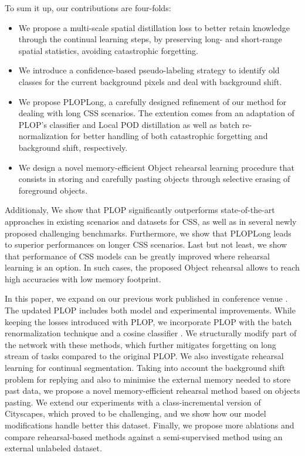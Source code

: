 To sum it up, our contributions are four-folds:
\begin{itemize}
    \item We propose a multi-scale spatial distillation loss to better retain knowledge through the
          continual learning steps, by preserving long- and short-range spatial statistics, avoiding
          catastrophic forgetting.
    \item We introduce a confidence-based pseudo-labeling strategy to identify old classes for the
          current background pixels and deal with background shift.
    \item We propose PLOPLong, a carefully designed refinement of our method for dealing with long
          CSS scenarios. The extention comes from an adaptation of PLOP's classifier and Local POD
          distillation as well as batch re-normalization for better handling of both catastrophic
          forgetting and background shift, respectively.
    \item We design a novel memory-efficient Object rehearsal learning procedure that consists in
          storing and carefully pasting objects through selective erasing of foreground objects.
\end{itemize}

Additionaly, We show that PLOP significantly outperforms state-of-the-art approaches in existing
scenarios and datasets for CSS, as well as in several newly proposed challenging benchmarks.
Furthermore, we show that PLOPLong leads to superior performances on longer CSS scenarios. Last but
not least, we show that performance of CSS models can be greatly improved where rehearsal learning
is an option. In such cases, the proposed Object rehearsal allows to reach high accuracies with low
memory footprint.

In this paper, we expand on our previous work published in conference venue
\citep{douillard2020plop}. The updated PLOP includes both model and experimental improvements. While
keeping the losses introduced with PLOP, we incorporate PLOP with the batch renormalization
technique \citep{ioffe2017batchrenorm} and a cosine classifier \citep{luo2018cosine_classifier}. We
structurally modify part of the network with these methods, which further mitigates forgetting on
long stream of tasks compared to the original PLOP. We also investigate rehearsal learning for
continual segmentation. Taking into account the background shift problem for replying and also to
minimise the external memory needed to store past data, we propose a novel memory-efficient
rehearsal method based on objects pasting. We extend our experiments with a class-incremental
version of Cityscapes, which proved to be challenging, and we show how our model modifications
handle better this dataset. Finally, we propose more ablations and compare rehearsal-based methods
against a semi-supervised method using an external unlabeled dataset.

